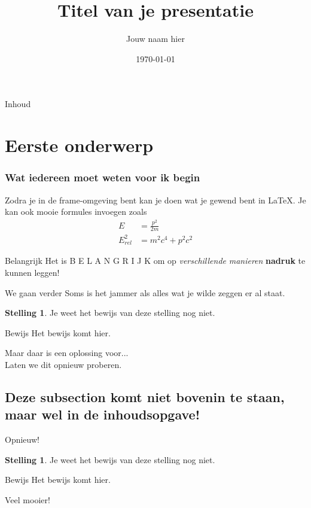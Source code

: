 \documentclass{beamer}
\title{Titel van je presentatie}
\date{\today}
\author{Jouw naam hier}
\theoremstyle{definition}
\theoremstyle{example}
\newtheorem{thm}[dfn]{Stelling}%
\begin{document}
\begin{frame}
\titlepage
\end{frame}	

\begin{frame}{Inhoud}%
	\tableofcontents
\end{frame}
\section{Eerste onderwerp}


\begin{frame}
	\frametitle{Wat iedereen moet weten voor ik begin}
	Zodra je in de frame-omgeving bent kan je doen wat je gewend bent in \LaTeX. Je kan ook mooie formules invoegen zoals
	\begin{align}
	E &= \frac{p^2}{2m}\\
	E_{rel}^2 &= m^2c^4 + p^2c^2
	\end{align}
	\begin{block}{Belangrijk}
		Het is   B E L A N G R I J K   om op \textit{verschillende} \emph{manieren} \textbf{nadruk} te kunnen leggen!
	\end{block}
 
\end{frame}

\begin{frame}{We gaan verder}
Soms is het jammer als alles wat je wilde zeggen er al staat.\newline
\begin{thm}
	Je weet het bewijs van deze stelling nog niet.
\end{thm}
\begin{block}{Bewijs}
	Het bewijs komt hier.
\end{block}
Maar daar is een oplossing voor...\\
Laten we dit opnieuw proberen.

\end{frame}

\subsection{Deze subsection komt niet bovenin te staan, maar wel in de inhoudsopgave!}

\begin{frame}{Opnieuw!}
\begin{thm}
	Je weet het bewijs van deze stelling nog niet.
\end{thm}
\pause
\begin{block}{Bewijs}
	Het bewijs komt hier.
\end{block}
\pause
Veel mooier!
\end{frame}
\end{document}
